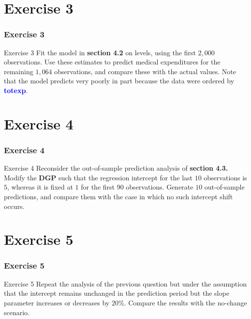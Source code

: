 \documentclass[11pt, aspectratio=169]{beamer}
\begin{document}
	\section{Exercise 3}
		\begin{frame}
			\frametitle{Exercise 3}
			\begin{block}{Exercise 3}
				Fit the model in \textcolor{red!50}{\textbf{section 4.2}} on levels, using the first $2,000$
				observations. Use these estimates to predict medical expenditures for
				the remaining $1,064$ observations, and compare these with the actual
				values. Note that the model predicts very poorly in part because the
				data were ordered by \textcolor{blue}{\textbf{totexp}}.
			\end{block}
		\end{frame}
	\section{Exercise 4}
		\begin{frame}
			\frametitle{Exercise 4}
			\begin{block}{Exercise 4}
				Reconsider the out-of-sample prediction analysis of \textcolor{red!50}{\textbf{section 4.3.}}
				Modify the \textbf{DGP} such that the regression intercept for the last $10$
				observations is $5$, whereas it is fixed at $1$ for the first $90$ observations.
				Generate $10$ out-of-sample predictions, and compare them with the
				case in which no such intercept shift occurs.
			\end{block}
		\end{frame}
	\section{Exercise 5}
		\begin{frame}
			\frametitle{Exercise 5}
			\begin{block}{Exercise 5}
				Repeat the analysis of the previous question but under the assumption
				that the intercept remains unchanged in the prediction period but the
				slope parameter increases or decreases by $20\%$. Compare the results
				with the no-change scenario.
			\end{block}
		\end{frame}
\end{document}
